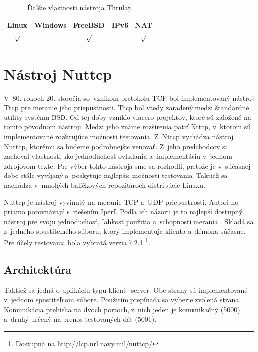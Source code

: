         \begin{table}[H]
            \begin{center}
                \begin{tabular}{|c|c|c|c|c|}
                    \hline
                    \textbf{Linux}  &  \textbf{Windows}  &
                    \textbf{FreeBSD} & \textbf{IPv6} &
                    \textbf{NAT} \\
                    \hline
                    $\surd$ &  & $\surd$ &  & $\surd$ \\ 
                    \hline
                \end{tabular}
                \caption{Ďalšie vlastnosti nástroja Thrulay.}
                \label{tab_thrulay_vlast}
            \end{center}
        \end{table}

    \section{Nástroj Nuttcp}
        V~80. rokoch 20. storočia so~vznikom protokolu TCP bol implementovaný 
        nástroj Ttcp pre meranie jeho priepustnosti. Ttcp bol vtedy zaradený 
        medzi štandardné utility systému BSD. Od tej doby vzniklo viacero
        projektov, ktoré sú založené na tomto pôvodnom nástroji. Medzi jeho
        známe rozšírenia patrí Nttcp, v~ktorom sú implementované rozširujúce
        možnosti testovania. Z~Nttcp vychádza nástroj Nuttcp, ktorému sa budeme
        podrobnejšie venovať. Z~jeho predchodcov si zachoval vlastnosti ako
        jednoduchosť ovládania a~implementáciu v~jednom 
        zdrojovom texte. Pre výber tohto nástroja sme sa rozhodli, pretože je
        v~súčasnej dobe stále vyvíjaný a~poskytuje najlepšie možnosti
        testovania. Taktiež sa nachádza v~mnohých balíčkových repozitároch 
        distribúcie Linuxu.

        Nuttcp je nástroj vyvinutý na meranie TCP a~UDP priepustnosti. 
        Autori ho priamo porovnávajú s~riešením
        Iperf. Podľa ich názoru je to najlepší dostupný nástroj 
        pre svoju jednoduchosť, ľahkosť použitia a~schopnosti merania
        \cite{nuttcp_home}. Skladá sa z~jedného spustiteľného súboru, ktorý
        implementuje klienta a~démona súčasne. Pre účely testovania bola
        vybratá verzia 7.2.1
        \footnote{Dostupná na \url{http://lcp.nrl.navy.mil/nuttcp/}}.

        \subsection{Architektúra}\label{nuttcp_arch}
        Taktiež sa jedná o~aplikáciu typu klient\,--\,server. Obe
        strany sú implementované v~jednom spustiteľnom súbore. Použitím 
        prepínača sa vyberie zvolená strana. Komunikácia prebieha
        na dvoch portoch, z~nich jeden je komunikačný (5000) a~druhý
        určený na prenos testovaných dát (5001).

